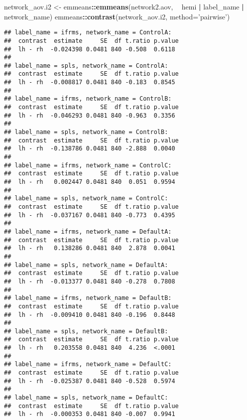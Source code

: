 \documentclass[
]{article}
\newenvironment{Shaded}{\begin{snugshade}}{\end{snugshade}}
\newcommand{\DataTypeTok}[1]{\textcolor[rgb]{0.13,0.29,0.53}{#1}}
\newcommand{\KeywordTok}[1]{\textcolor[rgb]{0.13,0.29,0.53}{\textbf{#1}}}
\newcommand{\NormalTok}[1]{#1}
\newcommand{\OperatorTok}[1]{\textcolor[rgb]{0.81,0.36,0.00}{\textbf{#1}}}
\newcommand{\StringTok}[1]{\textcolor[rgb]{0.31,0.60,0.02}{#1}}
\begin{document}
\begin{Shaded}
\begin{Highlighting}[]
\NormalTok{network_aov.i2 <-}\StringTok{ }\NormalTok{emmeans}\OperatorTok{::}\KeywordTok{emmeans}\NormalTok{(network2.aov, }\OperatorTok{~}\StringTok{ }\NormalTok{hemi }\OperatorTok{|}\StringTok{ }\NormalTok{label_name }\OperatorTok{|}\StringTok{ }\NormalTok{network_name)}
\NormalTok{emmeans}\OperatorTok{::}\KeywordTok{contrast}\NormalTok{(network_aov.i2, }\DataTypeTok{method=}\StringTok{'pairwise'}\NormalTok{)}
\end{Highlighting}
\end{Shaded}

\begin{verbatim}
## label_name = ifrms, network_name = ControlA:
##  contrast  estimate     SE  df t.ratio p.value
##  lh - rh  -0.024398 0.0481 840 -0.508  0.6118 
## 
## label_name = spls, network_name = ControlA:
##  contrast  estimate     SE  df t.ratio p.value
##  lh - rh  -0.008817 0.0481 840 -0.183  0.8545 
## 
## label_name = ifrms, network_name = ControlB:
##  contrast  estimate     SE  df t.ratio p.value
##  lh - rh  -0.046293 0.0481 840 -0.963  0.3356 
## 
## label_name = spls, network_name = ControlB:
##  contrast  estimate     SE  df t.ratio p.value
##  lh - rh  -0.138786 0.0481 840 -2.888  0.0040 
## 
## label_name = ifrms, network_name = ControlC:
##  contrast  estimate     SE  df t.ratio p.value
##  lh - rh   0.002447 0.0481 840  0.051  0.9594 
## 
## label_name = spls, network_name = ControlC:
##  contrast  estimate     SE  df t.ratio p.value
##  lh - rh  -0.037167 0.0481 840 -0.773  0.4395 
## 
## label_name = ifrms, network_name = DefaultA:
##  contrast  estimate     SE  df t.ratio p.value
##  lh - rh   0.138286 0.0481 840  2.878  0.0041 
## 
## label_name = spls, network_name = DefaultA:
##  contrast  estimate     SE  df t.ratio p.value
##  lh - rh  -0.013377 0.0481 840 -0.278  0.7808 
## 
## label_name = ifrms, network_name = DefaultB:
##  contrast  estimate     SE  df t.ratio p.value
##  lh - rh  -0.009410 0.0481 840 -0.196  0.8448 
## 
## label_name = spls, network_name = DefaultB:
##  contrast  estimate     SE  df t.ratio p.value
##  lh - rh   0.203558 0.0481 840  4.236  <.0001 
## 
## label_name = ifrms, network_name = DefaultC:
##  contrast  estimate     SE  df t.ratio p.value
##  lh - rh  -0.025387 0.0481 840 -0.528  0.5974 
## 
## label_name = spls, network_name = DefaultC:
##  contrast  estimate     SE  df t.ratio p.value
##  lh - rh  -0.000353 0.0481 840 -0.007  0.9941
\end{verbatim}
\end{document}
